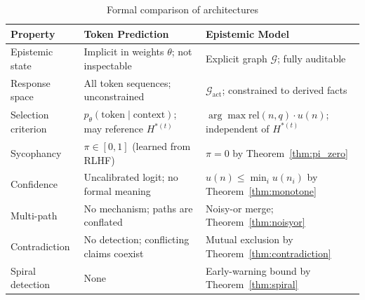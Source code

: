 \documentclass[12pt]{article}
\theoremstyle{definition}
\begin{document}
\begin{table}[h]
\centering
\caption{Formal comparison of architectures}
\label{tab:comparison}
\begin{tabular}{p{3.5cm}p{5cm}p{5cm}}
\toprule
Property & Token Prediction & Epistemic Model \\
\midrule
Epistemic state &
  Implicit in weights $\theta$; not inspectable &
  Explicit graph $\mathcal{G}$; fully auditable \\[4pt]
Response space &
  All token sequences; unconstrained &
  $\mathcal{G}_{\text{act}}$; constrained to derived facts \\[4pt]
Selection criterion &
  $p_\theta(\text{token} \mid \text{context})$; may reference $H^{*(t)}$ &
  $\arg\max \mathrm{rel}(n,q) \cdot u(n)$; independent of $H^{*(t)}$ \\[4pt]
Sycophancy &
  $\pi \in [0,1]$ (learned from RLHF) &
  $\pi = 0$ by Theorem~\ref{thm:pi_zero} \\[4pt]
Confidence &
  Uncalibrated logit; no formal meaning &
  $u(n) \leq \min_i u(n_i)$ by Theorem~\ref{thm:monotone} \\[4pt]
Multi-path &
  No mechanism; paths are conflated &
  Noisy-or merge; Theorem~\ref{thm:noisyor} \\[4pt]
Contradiction &
  No detection; conflicting claims coexist &
  Mutual exclusion by Theorem~\ref{thm:contradiction} \\[4pt]
Spiral detection &
  None &
  Early-warning bound by Theorem~\ref{thm:spiral} \\
\bottomrule
\end{tabular}
\end{table}
\end{document}
